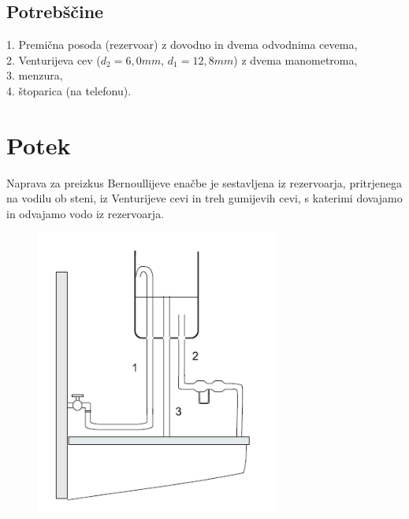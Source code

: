\documentclass[a4paper]{report}
\begin{document}
\section{Potrebščine}
1. Premična posoda (rezervoar) z dovodno in dvema odvodnima cevema,\\
2. Venturijeva cev ($d_2=6,0mm$, $d_1=12,8mm$) z dvema manometroma,\\
3. menzura,\\
4. štoparica (na telefonu).

\chapter*{Potek}
Naprava za preizkus Bernoullijeve enačbe je sestavljena iz rezervoarja, pritrjenega
na vodilu ob steni, iz Venturijeve cevi in treh gumijevih cevi, s katerimi dovajamo in
odvajamo vodo iz rezervoarja.\\

\begin{figure}[h]
\centering
\includegraphics[width=8cm]{Skica}
\end{figure}
\end{document}
